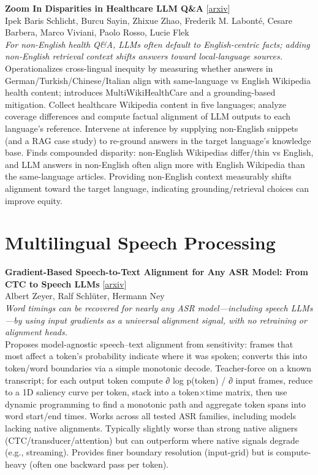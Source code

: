\documentclass[12pt,letterpaper]{article}
\begin{document}
\medskip

{\small\textbf{Zoom In Disparities in Healthcare LLM Q\&A}} {\scriptsize[\href{https://arxiv.org/abs/2510.17476}{arxiv}]}\\
{\scriptsize Ipek Baris Schlicht, Burcu Sayin, Zhixue Zhao, Frederik M. Labont\'e, Cesare Barbera, Marco Viviani, Paolo Rosso, Lucie Flek}\\

{\small\textit{For non-English health Q\&A, LLMs often default to English-centric facts; adding non-English retrieval context shifts answers toward local-language sources.}}\\[1pt]
{\footnotesize Operationalizes cross-lingual inequity by measuring whether answers in German/Turkish/Chinese/Italian align with same-language vs English Wikipedia health content; introduces MultiWikiHealthCare and a grounding-based mitigation. Collect healthcare Wikipedia content in five languages; analyze coverage differences and compute factual alignment of LLM outputs to each language's reference. Intervene at inference by supplying non-English snippets (and a RAG case study) to re-ground answers in the target language's knowledge base. Finds compounded disparity: non-English Wikipedias differ/thin vs English, and LLM answers in non-English often align more with English Wikipedia than the same-language articles. Providing non-English context measurably shifts alignment toward the target language, indicating grounding/retrieval choices can improve equity.}

\medskip


\section*{Multilingual Speech Processing}

{\small\textbf{Gradient-Based Speech-to-Text Alignment for Any ASR Model: From CTC to Speech LLMs}} {\scriptsize[\href{https://arxiv.org/abs/2607.06831}{arxiv}]}\\
{\scriptsize Albert Zeyer, Ralf Schl\"uter, Hermann Ney}\\

{\small\textit{Word timings can be recovered for nearly any ASR model---including speech LLMs---by using input gradients as a universal alignment signal, with no retraining or alignment heads.}}\\[1pt]
{\footnotesize Proposes model-agnostic speech--text alignment from sensitivity: frames that most affect a token's probability indicate where it was spoken; converts this into token/word boundaries via a simple monotonic decode. Teacher-force on a known transcript; for each output token compute ∂ log p(token) / ∂ input frames, reduce to a 1D saliency curve per token, stack into a token×time matrix, then use dynamic programming to find a monotonic path and aggregate token spans into word start/end times. Works across all tested ASR families, including models lacking native alignments. Typically slightly worse than strong native aligners (CTC/transducer/attention) but can outperform where native signals degrade (e.g., streaming). Provides finer boundary resolution (input-grid) but is compute-heavy (often one backward pass per token).}
\end{document}

